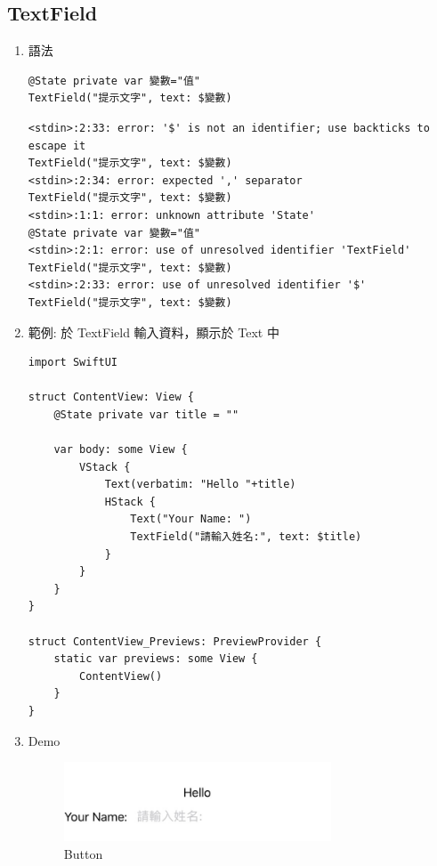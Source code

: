 \documentclass[a4paper,12pt]{article}
\begin{document}
\subsection{TextField}
\label{sec:org46d9d77}
\begin{enumerate}
\item 語法
\label{sec:orgf3c1d25}
\lstset{breaklines=true,language=swift,label= ,caption= ,captionpos=b,firstnumber=1,numbers=left}
\begin{lstlisting}
@State private var 變數="值"
TextField("提示文字", text: $變數)
\end{lstlisting}

\begin{verbatim}
<stdin>:2:33: error: '$' is not an identifier; use backticks to escape it
TextField("提示文字", text: $變數)
<stdin>:2:34: error: expected ',' separator
TextField("提示文字", text: $變數)
<stdin>:1:1: error: unknown attribute 'State'
@State private var 變數="值"
<stdin>:2:1: error: use of unresolved identifier 'TextField'
TextField("提示文字", text: $變數)
<stdin>:2:33: error: use of unresolved identifier '$'
TextField("提示文字", text: $變數)
\end{verbatim}

\item 範例: 於 TextField 輸入資料，顯示於 Text 中
\label{sec:org902f09a}
\lstset{breaklines=true,language=swift,label= ,caption= ,captionpos=b,firstnumber=1,numbers=left}
\begin{lstlisting}
import SwiftUI

struct ContentView: View {
    @State private var title = ""

    var body: some View {
        VStack {
            Text(verbatim: "Hello "+title)
            HStack {
                Text("Your Name: ")
                TextField("請輸入姓名:", text: $title)
            }
        }
    }
}

struct ContentView_Previews: PreviewProvider {
    static var previews: some View {
        ContentView()
    }
}
\end{lstlisting}

\item Demo
\label{sec:org644a968}
\begin{figure}[htbp]
\centering
\includegraphics[width=300]{images/txtfield-1.jpg}
\caption{\label{fig:Button-1}Button}
\end{figure}
\end{enumerate}
\end{document}
